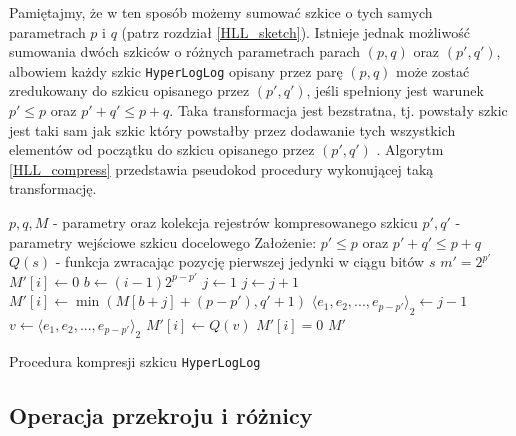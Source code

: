 Pamiętajmy, że w ten sposób możemy sumować szkice o tych samych parametrach $p$ i $q$ (patrz rozdział \ref{HLL_sketch}). Istnieje jednak możliwość sumowania dwóch szkiców o różnych parametrach parach $(p, q)$ oraz $(p',q')$, albowiem każdy szkic \texttt{HyperLogLog} opisany przez parę $(p, q)$ może zostać zredukowany do szkicu opisanego przez $(p', q')$, jeśli spełniony jest warunek $p' \leq p$ oraz $p' + q' \leq p + q$. Taka transformacja jest bezstratna, tj. powstały szkic jest taki sam jak szkic który powstałby przez dodawanie tych wszystkich elementów od początku do szkicu opisanego przez $(p', q')$ \cite{oertl}. Algorytm \ref{HLL_compress} przedstawia pseudokod procedury wykonującej taką transformację.
\begin{algorithm}
	\begin{algorithmic}
		\State $p, q, M $ - parametry oraz kolekcja rejestrów kompresowanego szkicu
		\State $p', q' $ - parametry wejściowe szkicu docelowego
		\State Założenie: $ p' \leq p$ oraz $p' + q' \leq p + q$
		\State $Q(s) $ -  funkcja zwracając pozycję pierwszej jedynki w ciągu bitów $s$ 
		\newline
		\State $m' = 2^{p'}$
			\State $M'[i] \gets 0$
		\EndFor
			\State $b \gets (i - 1)2^{p-p'}$
			\State $j \gets 1$
				\State $j \gets j + 1$
			\EndWhile
				\State $M'[i] \gets \min(M[b+j] + (p - p'), q' + 1)$
				\State ${{\langle}e_1, e_2, ..., e_{p-p'}{\rangle}}_2 \gets j - 1$
				\State $v \gets {{\langle}e_1, e_2, ..., e_{p-p'}{\rangle}}_2$ 
				\State $M'[i] \gets Q(v)$
			\Else
				\State $M'[i] = 0$
			\EndIf
		\EndFor
		\State \Return $M'$
		\EndFunction
		
	\end{algorithmic}
	\caption{Procedura kompresji szkicu \texttt{HyperLogLog}}
	\label{HLL_compress}
\end{algorithm}

\subsection{Operacja przekroju i różnicy}

